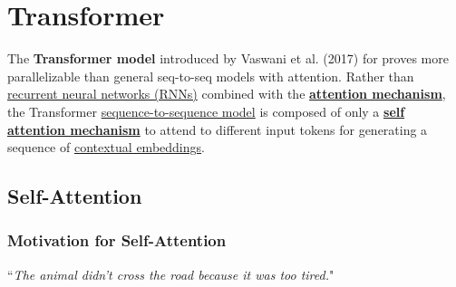 \section{Transformer} \label{sec:Transformer}
% 

The \textbf{Transformer model} introduced by Vaswani et al. (2017) for  proves more parallelizable than general seq-to-seq models with attention. Rather than \hyperref[sec:RNN]{ recurrent neural networks (RNNs)} combined with the \textbf{\hyperref[sec:AttentionMechanism]{attention mechanism}}, the Transformer \hyperref[sec:Seq2Seq]{sequence-to-sequence model} is composed of only a \textbf{\hyperref[sec:SelfAttention]{self attention mechanism}} to attend to different input tokens for generating a sequence of \hyperref[sec:SolutionWithContextEmbs]{contextual embeddings}. 




\subsection{Self-Attention} \label{sec:SelfAttention}

\subsubsection{Motivation for Self-Attention}

{\large ``}\textit{The animal didn't cross the road because it was too tired.}{\large "}


